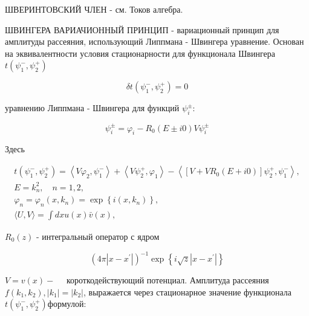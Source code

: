 \documentclass[10pt]{article}
\begin{document}
ШВЕРИНТОВСКИЙ ЧЛЕН - см. Токов алгебра.



ШВИНГЕРА ВАРИАЧИОННЫЙ ПРИНЦИП - вариационный принцип для амплитуды рассеяния, использующий Липпмана - Швингера уравнение. Основан на эквивалентности условия стационарности для функционала Швингера $t\left(\psi_{1}^{-}, \psi_{2}^{+}\right)$



\[

\delta t\left(\psi_{1}^{-}, \psi_{2}^{+}\right)=0

\]



уравнению Липпмана - Швингера для функций $\psi_{i}^{ \pm}$:



\[

\psi_{i}^{ \pm}=\varphi_{i}-R_{0}(E \pm i 0) V \psi_{i}^{ \pm}

\]



Здесь



\[

\begin{gathered}

t\left(\psi_{1}^{-}, \psi_{2}^{+}\right)=\left\langle V \varphi_{2}, \psi_{1}^{-}\right\rangle+\left\langle V \psi_{2}^{+}, \varphi_{1}\right\rangle-\left\langle\left[V+V R_{0}(E+i 0)\right] \psi_{2}^{+}, \psi_{1}^{-}\right\rangle, \\

E=k_{n}^{2}, \quad n=1,2, \\

\varphi_{n}=\varphi_{n}\left(x, k_{n}\right)=\exp \left\{i\left(x, k_{n}\right)\right\}, \\

\langle U, V\rangle=\int d x u(x) \bar{v}(x),

\end{gathered}

\]



$R_{0}(z)$ - интегральный оператор с ядром



\[

\left(4 \pi\left|x-x^{\prime}\right|\right)^{-1} \exp \left\{i \sqrt{z}\left|x-x^{\prime}\right|\right\}

\]



$V=v(x)-\quad$ короткодействующий потенциал. Амплитуда рассеяния $f\left(k_{1}, k_{2}\right),\left|k_{1}\right|=\left|k_{2}\right|$, выражается через стационарное значение функционала $t\left(\psi_{1}^{-}, \psi_{2}^{+}\right)$формулой:
\end{document}
